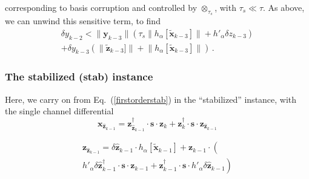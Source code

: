 \documentclass[letterpaper,twocolumn,amsmath,amsfont,amssymb,english,aps,jcp,preprintnumbers,groupaddress,nofootinbib,tightenlines]{revtex4}
\newcommand{\mat}[1]{\boldsymbol{#1}}
\newcommand{\ots}{ {\scriptstyle \otimes}_{ \tau_s } }
\begin{document}

corresponding to  basis corruption and controlled by $\ots$, with $\tau_s \ll \tau$. 
As above, we can unwind this sensitive term, to find 
\begin{multline}
\delta y_{k-2} <   \lVert \mat{y}_{k-3} \rVert  \left( \tau_s \lVert h_\alpha [ \widetilde{\mat{x}}_{k-3}] \rVert + h'_\alpha \delta z_{k-3} \right )\\
+  \delta y_{k-3}  \left( \lVert \widetilde{\mat{z}}_{k-3}]  \rVert + \lVert h_\alpha [ \widetilde{\mat{x}}_{k-3}]  \rVert
  \right)
\, .
\end{multline}




\subsubsection{The stabilized  (stab) instance}

Here, we carry on from Eq.~(\ref{firstorderstab}) in the ``stabilized'' instance, with the single channel differential 
\begin{equation}
 \mat{x}_{\widehat{\mat{z}}_{k-1}} =   \mat{z}^\dagger_{\widehat{\mat{z}}_{k-1}} \cdot \mat{s} \cdot \mat{z}_{k} + 
                                  \mat{z}^\dagger_k \cdot \mat{s} \cdot \mat{z}_{\widehat{\mat{z}}_{k-1}} 
\end{equation}



\begin{multline}
\mat{z}_{\widehat{\mat{z}}_{k-1} } = \delta \widehat{\mat{z}}_{k-1} \cdot h_\alpha[ \widetilde{\mat{x}}_{k-1} ] + \mat{z}_{k-1} \cdot \left( \right. \\
 \left.  h'_\alpha \delta \widehat{\mat{z}}^\dagger_{k-1} \cdot \mat{s} \cdot \mat{z}_{k-1} +  \mat{z}^\dagger_{k-1} \cdot \mat{s} \cdot h'_\alpha \delta \widehat{\mat{z}}_{k-1}
 \right) 
\end{multline}
\end{document}
